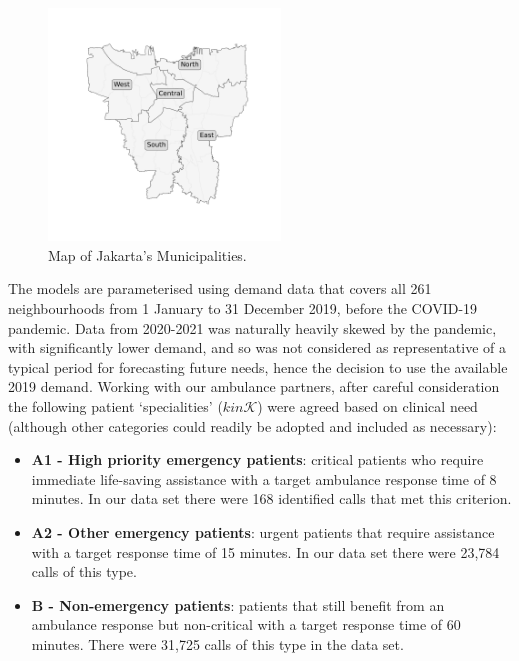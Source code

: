 \documentclass[preprint,12pt]{elsarticle}
\begin{document}
\begin{figure}
\begin{center}
\includegraphics[width=0.55\textwidth,trim={0 6cm 0 5cm}, clip]{img/jakarta_region_names.pdf}
\end{center}
\caption{Map of Jakarta's Municipalities.}
\label{fig:region_names}
\end{figure}

The models are parameterised using demand data that covers all 261
neighbourhoods from 1 January to 31 December 2019, before the COVID-19
pandemic. Data from 2020-2021 was naturally heavily skewed by the pandemic,
with significantly lower demand, and so was not considered as representative
of a typical period for forecasting future needs, hence the decision to use
the available 2019 demand.
Working with our ambulance partners, after careful consideration the following
patient `specialities' ($k in \mathcal{K}$) were agreed based on clinical need
(although other categories could readily be adopted and included as
necessary):


\begin{itemize}
  \item \textbf{A1 - High priority emergency patients}: critical patients who
  require immediate life-saving assistance with a target ambulance response
  time of 8 minutes.  In our data set there were 168 identified calls that met
  this criterion.
  \item \textbf{A2 - Other emergency patients}: urgent patients that require
  assistance with a target response time of 15 minutes. In our data set there
  were 23,784 calls of this type.
  \item \textbf{B - Non-emergency patients}: patients that still benefit from
  an ambulance response but non-critical with a target response time of 60
  minutes. There were 31,725 calls of this type in the data set.
\end{itemize}
\end{document}
